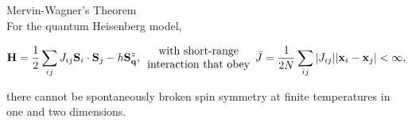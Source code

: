 \documentclass{homework}
\begin{document}
\begin{theorem}Mervin-Wagner's Theorem \\
\label{Mervin-Wagner}
For the quantum Heisenberg model, 

\begin{equation}
    {\bf H} = \frac{1}{2} \sum_{ij} J_{ij} {\bf S}_i \cdot {\bf S}_j - h {{\bf S}}^z_{{\bf q}}, \begin{array}{c}
         \textnormal{with short-range}  \\
         \textnormal{interaction that obey}
    \end{array} \bar{J} = \frac{1}{2N} \sum_{ij} |J_{ij}| |{{\bf x}_i - {\bf x}_j}| < \infty,
    \label{HH_short_range_MW}
\end{equation}
    
there cannot be spontaneously broken spin symmetry at finite temperatures in one and two dimensions.
\end{theorem}
\end{document}
